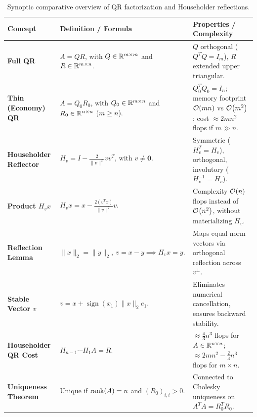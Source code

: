 \begin{table}[H]
\centering
\small
\renewcommand{\arraystretch}{1.18}
\begin{tabularx}{\linewidth}{>{\raggedright\arraybackslash}p{3.0cm} Y Y}
\toprule
\textbf{Concept} & \textbf{Definition / Formula} & \textbf{Properties / Complexity} \\
\midrule
\textbf{Full QR} & $A = QR$, with $Q \in \mathbb{R}^{m \times m}$ and $R \in \mathbb{R}^{m \times n}$. & $Q$ orthogonal ($Q^T Q = I_m$), $R$ extended upper triangular. \\
\textbf{Thin (Economy) QR} & $A = Q_0 R_0$, with $Q_0 \in \mathbb{R}^{m \times n}$ and $R_0 \in \mathbb{R}^{n \times n}$ ($m \ge n$). & $Q_0^T Q_0 = I_n$; memory footprint $\mathcal{O}\!\left(mn\right)$ vs $\mathcal{O}\!\left(m^2\right)$; cost $\approx 2mn^2$ flops if $m \gg n$. \\
\textbf{Householder Reflector} & $H_v = I - \frac{2}{\|v\|^2} v v^T$, with $v \neq \mathbf{0}$. & Symmetric ($H_v^T = H_v$), orthogonal, involutory ($H_v^{-1} = H_v$). \\
\textbf{Product $H_v x$} & $H_v x = x - \frac{2(v^T x)}{\|v\|^2} v$. & Complexity $\mathcal{O}\!\left(n\right)$ flops instead of $\mathcal{O}\!\left(n^2\right)$, without materializing $H_v$. \\
\textbf{Reflection Lemma} & $\|x\|_2 = \|y\|_2, \ v = x - y \implies H_v x = y$. & Maps equal-norm vectors via orthogonal reflection across $v^\perp$. \\
\textbf{Stable Vector $v$} & $v = x + \operatorname{sign}(x_1) \|x\|_2 e_1$. & Eliminates numerical cancellation, ensures backward stability. \\
\textbf{Householder QR Cost} & $H_{n-1} \cdots H_1 A = R$. & $\approx \frac{4}{3} n^3$ flops for $A \in \mathbb{R}^{n \times n}$; $\approx 2mn^2 - \frac{2}{3}n^3$ flops for $m \times n$. \\
\textbf{Uniqueness Theorem} & Unique if $\operatorname{rank}(A) = n$ and $(R_0)_{i,i} > 0$. & Connected to Cholesky uniqueness on $A^T A = R_0^T R_0$. \\
\bottomrule
\end{tabularx}
\caption{Synoptic comparative overview of QR factorization and Householder reflections.}
\label{tab:synoptic-summary-qr-en}
\end{table}

